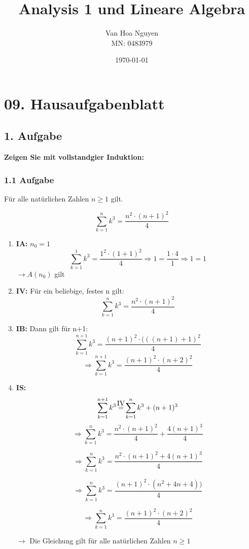 \documentclass{report}
\title{\Huge{Analysis 1 und Lineare Algebra}}
\author{\huge{Van Hoa Nguyen}\\MN: 0483979}
\date{\today}
\newcommand\myeq{\stackrel{\mathclap{\normalfont\mbox{{IV}}}}{=}}
\begin{document}
\maketitle


\chapter*{09. Hausaufgabenblatt}

\section*{1. Aufgabe}
\textbf{Zeigen Sie mit vollstandgier Induktion:}
\subsection*{1.1 Aufgabe}
Für alle natürlichen Zahlen $n \geq 1$ gilt.

$$\sum_{k=1}^{n}k^{3} = \frac{n^{2}\cdot(n+1)^{2}}{4}$$

\begin{enumerate}

    \item \textbf{IA:} $n_0=1$ 
        \[
            \sum_{k=1}^{1}k^{3} = \frac{1^{2}\cdot(1+1)^{2}}{4}
            \Rightarrow 1=\frac{1\cdot4}{1}
            \Rightarrow 1=1
        \]
        $\rightarrow A(n_0)$ gilt
    \item \textbf{IV:} Für ein beliebige, festes n gilt:
        $$\sum_{k=1}^{n}k^{3} = \frac{n^{2}\cdot(n+1)^2}{4}$$

    \item \textbf{IB:}  Dann gilt für n+1:
        $$\sum_{k=1}^{n+1}k^{3} = \frac{(n+1)^{2}\cdot(((n+1)+1)^2}{4}$$
        $$\Rightarrow\sum_{k=1}^{n+1}k^{3} = \frac{(n+1)^{2}\cdot(n+2)^2}{4}$$

    \item \textbf{IS:}  
        \[
            \sum_{k=1}^{n+1}k^{3} \myeq \sum_{k=1}^{n}k^{3} + (n+1)^{3}
        \]
        $$\Rightarrow \sum_{k=1}^{n}k^{3}= \frac{n^{2} \cdot (n+1)^2}{4} + \frac{4(n+1)^{3}}{4}$$

        $$\Rightarrow \sum_{k=1}^{n}k^{3}= \frac{n^{2} \cdot (n+1)^2+{4(n+1)^{3}}}{4}$$

        $$\Rightarrow \sum_{k=1}^{n}k^{3}= \frac{(n+1)^{2}\cdot(n^2+4n+4))}{4}$$

        $$\Rightarrow \sum_{k=1}^{n}k^{3}= \frac{(n+1)^{2}\cdot(n+2)^2}{4}$$

        $\rightarrow$ Die Gleichung gilt für alle natürlichen Zahlen $n \geq 1$

\end{enumerate}
\end{document}
